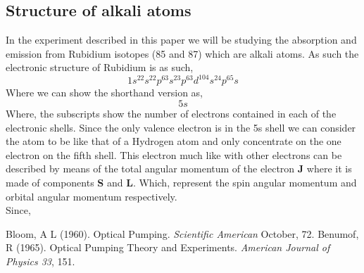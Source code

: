 \documentclass[twocolumn]{article}
\begin{document}
\subsection{Structure of alkali atoms}
In the experiment described in this paper we will be studying the absorption 
and emission from Rubidium isotopes (85 and 87) which are alkali atoms. As such the electronic structure of Rubidium is as such,
\begin{equation*}
1s^22s^22p^63s^23p^63d^104s^24p^65s
\end{equation*}
Where we can show the shorthand version as,
\begin{equation*}
[Kr]5s
\end{equation*}
Where, the subscripts show the number of electrons contained in each of the 
electronic shells. Since the only valence electron is in the 5s shell we can 
consider the atom to be like that of a Hydrogen atom and only concentrate on 
the one electron on the fifth shell. This electron much like with other 
electrons can be described by means of the total angular momentum of the 
electron \textbf{J} where it is made of components \textbf{S} and \textbf{L}. 
Which, represent the spin angular momentum and orbital angular momentum 
respectively.
\\
Since, 

\begin{thebibliography}{9}
Bloom, A L (1960). Optical Pumping. \emph{Scientific American} October, 72.
Benumof, R (1965). Optical Pumping Theory and Experiments. \emph{American 
Journal of Physics 33}, 151.

\end{thebibliography}
\end{document}
